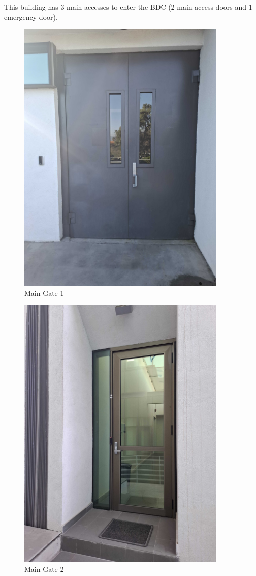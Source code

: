 This building has 3 main accesses to enter the BDC (2 main access doors and 1 emergency door).

\begin{figure}
    \includegraphics[width=10cm]{15.jpg}
    \centering
    \caption*{Main Gate 1}
  \end{figure}

  \newpage

\begin{figure}
    \includegraphics[width=10cm]{16.jpg}
    \centering
    \caption*{Main Gate 2}
  \end{figure}

